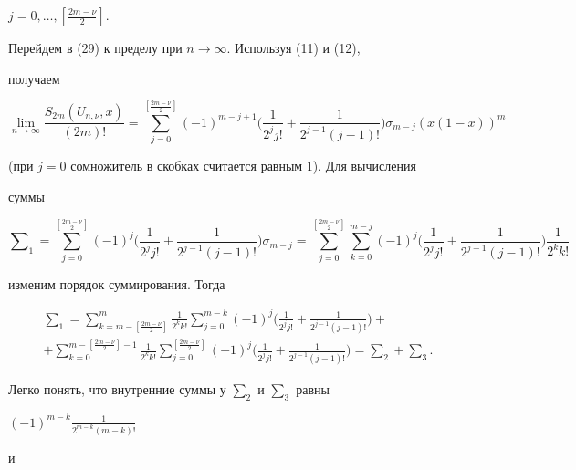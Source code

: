 \begin{pf}
$j=0,\dotsc,[\frac{2m-\nu}{2}]$. 


Перейдем в (29) к пределу при $n\to\infty$. Используя (11) и (12), 


получаем 


$$ 


\lim_{n\to\infty}\frac{S_{2m}(U_{n,\nu},x)}{(2m)!}= 


\sum^{[\frac{2m-\nu}{2}]}_{j=0}(-1)^{m-j+1} 


\bigg(\frac{1}{2^j j!}+\frac{1}{2^{j-1}(j-1)!} \bigg) 


\sigma_{m-j}(x(1-x))^m 


$$ 


(при $j=0$ сомножитель в скобках считается равным 1). Для вычисления 


суммы 


$$ 


\sum\nolimits_1=\sum^{[\frac{2m-\nu}{2}]}_{j=0} 


(-1)^j\bigg(\frac{1}{2^j j!}+\frac{1}{2^{j-1}(j-1)!} \bigg) 


\sigma_{m-j}=\sum^{[\frac{2m-\nu}{2}]}_{j=0}\sum^{m-j}_{k=0}


(-1)^j 


\bigg(\frac{1}{2^j j!}+\frac{1}{2^{j-1}(j-1)!} \bigg) 


\frac{1}{2^k k!} 


$$ 


изменим порядок суммирования. Тогда 


\begin{multline*} 


\sum\nolimits_1=\sum^m_{k=m-[\frac{2m-\nu}{2}]}\frac{1}{2^k k!} 


\sum^{m-k}_{j=0}(-1)^j\bigg(\frac{1}{2^j j!}+\frac{1}{2^{j-1}(j-1)!} 


\bigg)+ \\


+\sum^{m-[\frac{2m-\nu}{2}]-1}_{k=0} 


\frac{1}{2^k k!}\sum^{[\frac{2m-\nu}{2}]}_{j=0}(-1)^j 


\bigg(\frac{1}{2^j j!}+\frac{1}{2^{j-1}(j-1)!} \bigg)= 


\sum\nolimits_2+\sum\nolimits_3. 


\end{multline*}  


Легко понять, что внутренние суммы у $\sum_2$ и $\sum_3$ равны 


$(-1)^{m-k}\frac{1}{2^{m-k}(m-k)!}$ 


и 



\end{pf}
